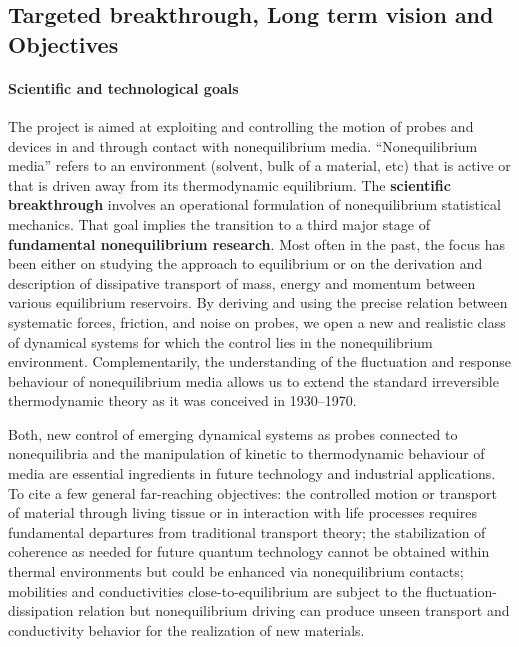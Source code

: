 \subsection{Targeted breakthrough, Long term vision and Objectives}\label{sec:objectives}


\paragraph{Scientific and technological goals}

The project is aimed at exploiting and controlling the motion of probes and devices in and
through contact with nonequilibrium media. ``Nonequilibrium media'' refers to an environment
(solvent, bulk of a material, etc) that is active or that is driven away from its
thermodynamic equilibrium.
%
The {\bf scientific
  breakthrough} involves an operational formulation of nonequilibrium statistical mechanics.
That goal implies the transition to a third major stage of {\bf fundamental nonequilibrium
  research}. Most often in the past, the focus has been either on studying the approach to equilibrium or on
the derivation and description of dissipative transport of mass, energy and momentum between
various equilibrium reservoirs.  By deriving and using the precise relation between
systematic forces, friction, and noise on probes, we open a new and realistic class of
dynamical systems for which the control lies in the nonequilibrium environment.
Complementarily, the understanding of the fluctuation and response behaviour of nonequilibrium
media allows us to extend the standard irreversible thermodynamic theory as it was conceived in
1930--1970.

Both, new control of emerging dynamical systems as probes connected to nonequilibria and the manipulation of kinetic to thermodynamic behaviour of media are essential
ingredients in future technology and industrial applications.  To cite a few general
far-reaching objectives: the controlled motion or transport of material through living
tissue or in interaction with life processes requires fundamental departures from
traditional transport theory; the stabilization of coherence as needed for future quantum
technology cannot be obtained within thermal environments but could be enhanced via
nonequilibrium contacts; mobilities and conductivities close-to-equilibrium are subject to
the fluctuation-dissipation relation but nonequilibrium driving can produce unseen transport
and conductivity behavior for the realization of new materials. 


